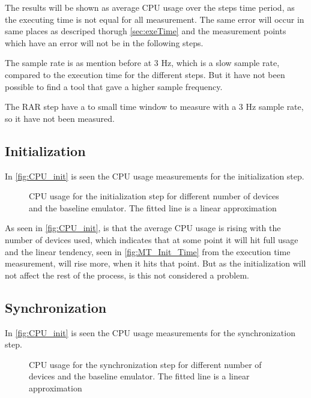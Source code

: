 The results will be shown as average CPU usage over the steps time period, as the executing time is not equal for all measurement. The same error will occur in same places as descriped thorugh \autoref{sec:exeTime} and the measurement points which have an error will not be in the following steps.

The sample rate is as mention before at 3 Hz, which is a slow sample rate, compared to the execution time for the different steps. But it have not been possible to find a tool that gave a higher sample frequency.

The RAR step have a to small time window to measure with a 3 Hz sample rate, so it have not been measured.

\subsection{Initialization}
In \autoref{fig:CPU_init} is seen the CPU usage measurements for the initialization step.

\begin{figure}[H]
\centering
\resizebox{0.5\textwidth}{!}{
}
\caption{CPU usage for the initialization step for different number of devices and the baseline emulator. The fitted line is a linear approximation}
\label{fig:CPU_init}
\end{figure}

As seen in \autoref{fig:CPU_init}, is that the average CPU usage is rising with the number of devices used, which indicates that at some point it will hit full usage and the linear tendency, seen in \autoref{fig:MT_Init_Time} from the execution time measurement, will rise more, when it hits that point. But as the initialization will not affect the rest of the process, is this not considered a problem.

\subsection{Synchronization}
In \autoref{fig:CPU_init} is seen the CPU usage measurements for the synchronization step.

\begin{figure}[H]
\centering
\resizebox{0.5\textwidth}{!}{
}
\caption{CPU usage for the synchronization step for different number of devices and the baseline emulator. The fitted line is a linear approximation}
\label{fig:CPU_sync}
\end{figure}

